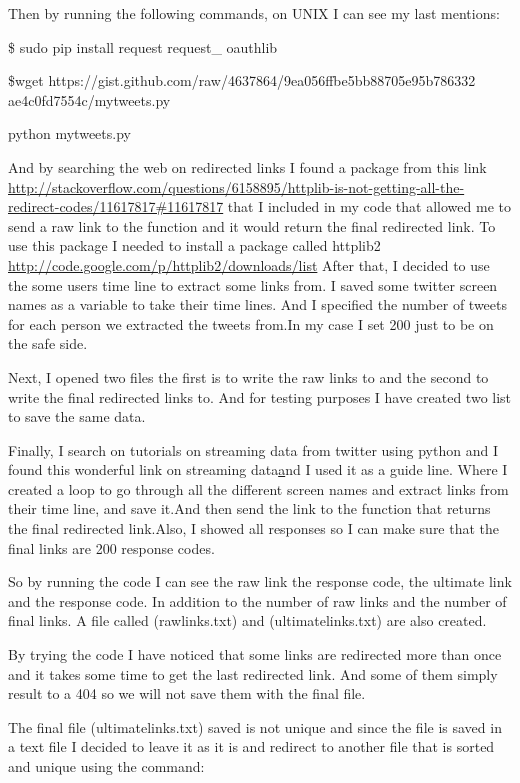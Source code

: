 \documentclass[letterpaper,11pt]{article}
\begin{document}
Then by running the following commands, on UNIX I can see my last mentions:

\$ sudo pip install request request\_ oauthlib

\$wget https://gist.github.com/raw/4637864/9ea056ffbe5bb88705e95b786332
ae4c0fd7554c/mytweets.py

python mytweets.py

And by searching the web on redirected links I found a package from this link \url{http://stackoverflow.com/questions/6158895/httplib-is-not-getting-all-the-redirect-codes/11617817#11617817} that I included in my code that allowed me to send a raw link to the function and it would return the final redirected link.
To use this package I needed to install a package called httplib2 \url{http://code.google.com/p/httplib2/downloads/list}
After that, I decided to use the some users time line to extract some links from. I saved some twitter screen names as a variable to take their time lines. And I specified the number of tweets for each person we extracted the tweets from.In my case I set 200 just to be on the safe side.

Next, I opened two files  the first is to write the raw links to and the second to write the final redirected links to.
And for testing purposes I have created two list to save the same data.

Finally, I search on tutorials on streaming data from twitter using python and I found this wonderful link on streaming data\href{http://mike.teczno.com/notes/streaming-data-from-twitter.html} and I used it as a guide line. Where I created a loop to go through all the different screen names and extract links from their time line, and save it.And then send the link to the function that returns the final redirected link.Also, I showed all responses so I can make sure that the final links are 200 response codes.

So by running the code I can see the raw link the response code, the ultimate link and the response code. In addition to the number of raw links and the number of final links. A file called (rawlinks.txt) and (ultimatelinks.txt) are also created.

By trying the code I have noticed that some links are redirected more than once and it takes some time to get the last redirected link. And some of them simply result to a 404 so we will not save them with the final file. 

The final file (ultimatelinks.txt) saved is not unique and since the file is saved in a text file I decided to leave it as it is and redirect to another file that is sorted and unique using the command:
\end{document}
